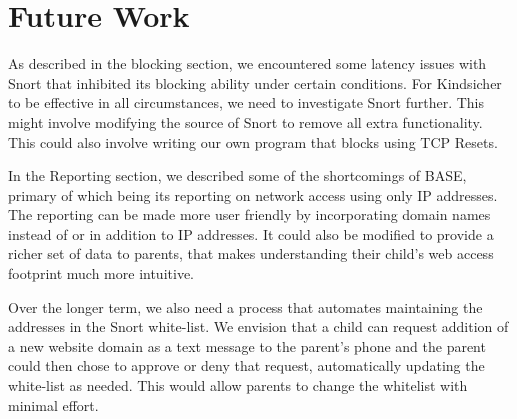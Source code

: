 
\section{Future Work}

As described in the blocking section, we encountered some latency issues with
Snort that inhibited its blocking ability under certain conditions. For
Kindsicher to be effective in all circumstances, we need to investigate Snort
further. This might involve modifying the source of Snort to remove all extra
functionality. This could also involve writing our own program that blocks
using TCP Resets.

In the Reporting section, we described some of the shortcomings of BASE,
primary of which being its reporting on network access using only IP addresses.
The reporting can be made more user friendly by incorporating domain names
instead of or in addition to IP addresses. It could also be modified to provide
a richer set of data to parents, that makes understanding their child's web
access footprint much more intuitive.

Over the longer term, we also need a process that automates maintaining the
addresses in the Snort white-list. We envision that a child can request
addition of a new website domain as a text message to the parent's phone and
the parent could then chose to approve or deny that request, automatically
updating the white-list as needed. This would allow parents to change the
whitelist with minimal effort.

